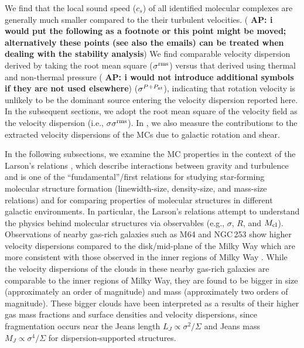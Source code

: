 \documentclass[apj]{emulateapj} %
\newcommand{\AP}[1]{({\bf \color{apcolor} AP: #1})}
\begin{document}
{We find that the local sound speed ($c_s$)
of all identified molecular complexes are generally much smaller compared to the their
turbulent velocities.
\AP{i would put the following as a footnote or this point might be moved; alternatively these points (see also the emails) can be treated when dealing with the stability analysis}
We find comparable velocity dispersion derived by taking the root mean square ($\sigma^{\rm rms}$) versus
that derived using thermal and non-thermal pressure \AP{i would not introduce additional symbols if they are not used elsewhere} ($\sigma^{P+P_{\rm nt}}$), indicating that
rotation velocity is unlikely to be the dominant source entering the velocity dispersion reported here.
In the subsequent sections, we adopt the root mean square of the velocity field
as the velocity dispersion (i.e., $\sigma$\eq$\sigma^{\rm rms}$).
In , we also measure the contributions to the extracted velocity dispersions of the
MCs due to galactic rotation and shear.

In the following subsections,
we examine the MC properties in the context of the Larson's relations \citep{Larson81a}, which
describe interactions between gravity and turbulence and is one of the ``fundamental''/first
relations for studying star-forming molecular structure formation (linewidth-size,
density-size, and mass-size relations) and for comparing properties of molecular structures
in different galactic environments.
In particular, the Larson's relations attempt to understand the physics behind molecular
structures via observables (e.g., $\sigma$, $R$, and $M_{\rm cl}$).
Observations of nearby gas-rich galaxies such as M64 and NGC\,253
show higher velocity dispersions compared
to the disk/mid-plane of the Milky Way which
are more consistent with those observed in the inner regions of
Milky Way \citep{Oka01a, Rosolowsky05a, Heyer09a, Leroy15a}.  %
While the velocity dispersions of the clouds in these nearby gas-rich galaxies are comparable
to the inner regions of Milky Way, they are found to be bigger in size (approximately
an order of magnitude) and mass (approximately two orders of magnitude).
These bigger clouds have been interpreted as a results of their higher gas mass fractions and
surface densities and velocity dispersions, since
fragmentation occurs near the Jeans length $L_J\propto\sigma^2/\Sigma$
and Jeans mass $M_J\propto\sigma^4/\Sigma$
for dispersion-supported structures.

}
\end{document}
